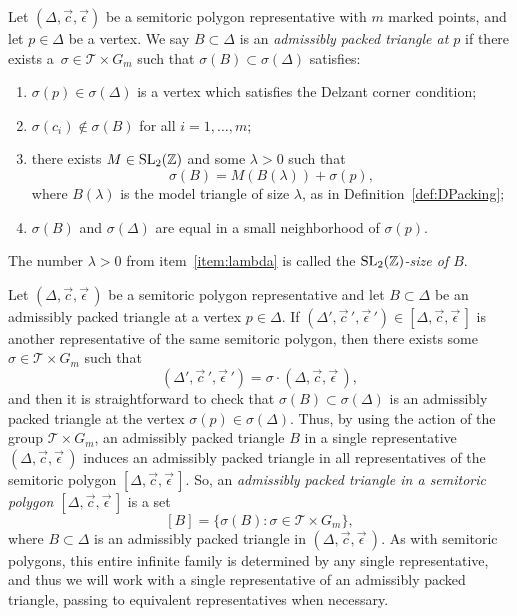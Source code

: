 \documentclass[pdftex]{sigma}
\numberwithin{equation}{section}
\def\Z{{\mathbb Z}}
\newcommand{\De}{\Delta}
\newcommand{\SL}{{\rm SL}_2(\Z)}
\newcommand{\stpoly}{[\De,\vec{c},\vec{\epsilon}\,]}
\newcommand{\strep}{(\De,\vec{c},\vec{\epsilon}\,)}
\begin{document}
\begin{Definition}\label{def:STadm-packed-triangle}
Let $(\De,\vec c, \vec \epsilon)$ be a semitoric polygon representative with $m$ marked points, and let $p\in\Delta$ be a vertex. We say $B \subset \De$ is an \emph{admissibly packed triangle at $p$} if there exists a~$\sigma \in \mathcal{T}\times G_m$ such that $\sigma(B) \subset \sigma(\De)$ satisfies:
\begin{enumerate}\itemsep=0pt
 \item[(1)] $\sigma(p)\in\sigma(\De)$ is a vertex which satisfies the Delzant corner condition;
 \item[(2)] $\sigma(c_i)\notin \sigma(B)$ for all $i=1,\ldots,m$;
 \item[(3)]\label{item:lambda} there exists $M\in\SL$ and some $\lambda>0$ such that
 \[
 \sigma(B) = M(B(\lambda)) + \sigma(p),
 \]
 where $B(\lambda)$ is the model triangle of size $\lambda$, as in Definition~\ref{def:DPacking};
 \item[(4)] $\sigma(B)$ and $\sigma(\De)$ are equal in a small neighborhood of $\sigma(p)$.
\end{enumerate}
The number $\lambda>0$ from item~\eqref{item:lambda} is called the \emph{$\SL$-size of $B$}.
\end{Definition}

Let $\strep$ be a semitoric polygon representative and let $B\subset \De$ be an admissibly packed triangle at a vertex $p\in\De$.
If $(\De',\vec{c}\,{}',\vec{\epsilon}\,{}')\in\stpoly$ is another representative of the same semitoric polygon, then there exists some $\sigma \in \mathcal{T}\times G_m$ such that
\[(\De',\vec{c}\,{}',\vec{\epsilon}\,{}' ) = \sigma \cdot \strep,\]
and then it is straightforward to check that $\sigma(B)\subset\sigma(\De)$
is an admissibly packed triangle at the vertex $\sigma(p)\in\sigma(\De)$.
Thus, by using the action of the group $\mathcal{T}\times G_m$,
an admissibly packed triangle $B$ in a single representative $\strep$ induces an admissibly packed triangle in all representatives of the semitoric polygon $\stpoly$.
So, an \emph{admissibly packed triangle in a semitoric polygon $\stpoly$} is a set
\[
 [B] = \{\sigma(B)\colon \sigma\in\mathcal{T}\times G_m\},
\]
where $B\subset \De$ is an admissibly packed triangle in $\strep$.
As with semitoric polygons, this entire infinite family is determined by any single representative, and thus we will work with a single representative of an admissibly packed triangle, passing to equivalent representatives when necessary.
\end{document}
